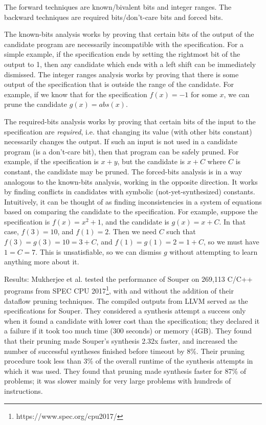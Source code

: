 \documentclass[12pt,twoside]{reedthesis}
\begin{document}
            The forward techniques are known/bivalent bits and integer ranges.
            The backward techniques are required bits/don't-care bits and forced bits.
            
            The known-bits analysis works by proving that certain bits of the output of the candidate program are necessarily incompatible with the specification.
                For a simple example, if the specification ends by setting the rightmost bit of the output to 1, then any candidate which ends with a left shift can be immediately dismissed.
            The integer ranges analysis works by proving that there is some output of the specification that is outside the range of the candidate.
                For example, if we know that for the specification $f(x) = -1$ for some $x$, we can prune the candidate $g(x) = abs(x)$.
            
            The required-bits analysis works by proving that certain bits of the input to the specification are \textit{required}, i.e. that changing its value (with other bits constant) necessarily changes the output.
                If such an input is not used in a candidate program (is a don't-care bit), then that program can be safely pruned.
                    For example, if the specification is $x + y$, but the candidate is $x + C$ where $C$ is constant, the candidate may be pruned.
            The forced-bits analysis is in a way analogous to the known-bits analysis, working in the opposite direction.
                It works by finding conflicts in candidates with symbolic (not-yet-synthesized) constants.
                Intuitively, it can be thought of as finding inconsistencies in a system of equations based on comparing the candidate to the specification.
                For example, suppose the specification is $f(x) = x^2 + 1$, and the candidate is $g(x) = x + C$. In that case, $f(3) = 10$, and $f(1) = 2$. Then we need $C$ such that $f(3) = g(3) = 10 = 3 + C$, and $f(1) = g(1) = 2 = 1 + C$, so we must have $1 = C = 7$. This is unsatisfiable, so we can dismiss $g$ without attempting to learn anything more about it.
            
            Results: Mukherjee et al. tested the performance of Souper on 269,113 C/C++ programs from SPEC CPU 2017\footnote{https://www.spec.org/cpu2017/}, with and without the addition of their dataflow pruning techniques.
            The compiled outputs from LLVM served as the specifications for Souper.
            They considered a synthesis attempt a success only when it found a candidate with lower cost than the specification;
            they declared it a failure if it took too much time (300 seconds) or memory (4GB).
            They found that their pruning made Souper's synthesis 2.32x faster, and increased the number of successful syntheses finished before timeout by 8\%.
            Their pruning procedure took less than 3\% of the overall runtime of the synthesis attempts in which it was used.
            They found that pruning made synthesis faster for 87\% of problems; it was slower mainly for very large problems with hundreds of instructions.
\end{document}
